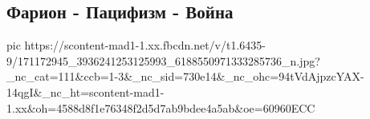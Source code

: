  
 
 
 
 

\subsection{Фарион - Пацифизм - Война}
\label{sec:08_04_2021.fb.farion_irina.2.pacifizm}

\ifcmt
  pic https://scontent-mad1-1.xx.fbcdn.net/v/t1.6435-9/171172945_3936241253125993_6188550971333285736_n.jpg?_nc_cat=111&ccb=1-3&_nc_sid=730e14&_nc_ohc=94tVdAjpzcYAX-14qgI&_nc_ht=scontent-mad1-1.xx&oh=4588d8f1e76348f2d5d7ab9bdee4a5ab&oe=60960ECC
\fi

